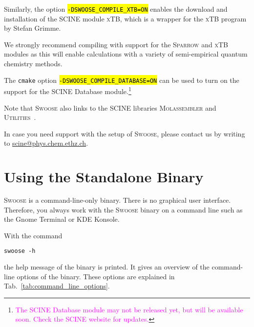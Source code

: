 \documentclass[]{tufte-book}
\begin{document}
Similarly, the option \hl{\:\texttt{-DSWOOSE\_COMPILE\_XTB=ON}\:} enables the download and installation of the SCINE module \textsc{xTB}, which is a wrapper for the \textsc{xTB} program\cite{bannwarth20} by Stefan Grimme.

We strongly recommend compiling with support for the \textsc{Sparrow} and \textsc{xTB} modules as this will enable calculations with a variety of semi-empirical quantum chemistry methods.

\newpage %
The \texttt{cmake} option \hl{\:\texttt{-DSWOOSE\_COMPILE\_DATABASE=ON}\:} can be used to turn on the support for the SCINE Database module.\footnote{\textcolor{magenta}{The SCINE Database module may not be released yet, but will be available soon. Check the SCINE website for updates.}}

Note that \textsc{Swoose} also links to the SCINE libraries \textsc{Molassembler}\cite{molassembler} and \textsc{Utilities}~\cite{utils}.

In case you need support with the setup of \textsc{Swoose}, please contact us by writing to \href{scine@phys.chem.ethz.ch}{scine@phys.chem.ethz.ch}.

\chapter{Using the Standalone Binary}

\textsc{Swoose} is a command-line-only binary. There is no graphical user interface. Therefore, you always work with the
\textsc{Swoose} binary on a command line such as the Gnome Terminal or KDE Konsole.

With the command
\begin{mdframed}[backgroundcolor=LightSteelBlue!25, linewidth=0pt]
\begin{verbatim}
swoose -h
\end{verbatim}
\end{mdframed}
the help message of the binary is printed. It gives an overview of the command-line
options of the binary. These options are explained in Tab.~\ref{tab:command_line_options}.
\end{document}
